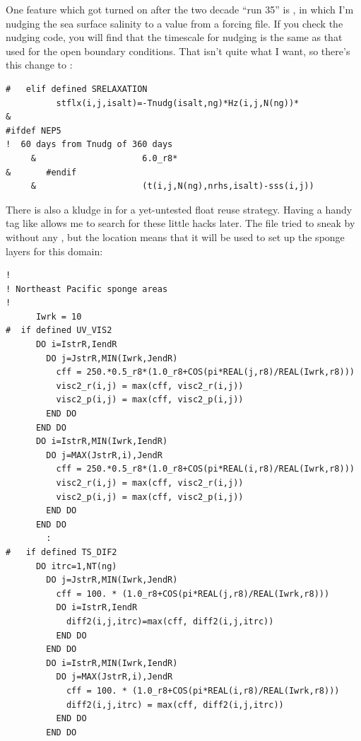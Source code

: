 One feature which got turned on after the two decade ``run 35'' is
, in which I'm nudging the sea surface salinity to
a value from a forcing file. If you check the nudging code, you will
find that the timescale for nudging is the same as that used for the
open boundary conditions. That isn't quite what I want, so there's
this change to :
\begin{verbatim}
#   elif defined SRELAXATION
          stflx(i,j,isalt)=-Tnudg(isalt,ng)*Hz(i,j,N(ng))*
&
#ifdef NEP5   
!  60 days from Tnudg of 360 days
     &                     6.0_r8*
&       #endif
     &                     (t(i,j,N(ng),nrhs,isalt)-sss(i,j))
\end{verbatim}
There is also a kludge in  for a yet-untested
float reuse strategy. Having a handy tag like  allows me
to search for these little hacks later. The file
 tried to sneak by without any
, but the location means that it will be used to set up
the sponge layers for this domain:
\begin{verbatim}
!
! Northeast Pacific sponge areas
!
      Iwrk = 10
#  if defined UV_VIS2
      DO i=IstrR,IendR
        DO j=JstrR,MIN(Iwrk,JendR)
          cff = 250.*0.5_r8*(1.0_r8+COS(pi*REAL(j,r8)/REAL(Iwrk,r8)))
          visc2_r(i,j) = max(cff, visc2_r(i,j))
          visc2_p(i,j) = max(cff, visc2_p(i,j))
        END DO
      END DO
      DO i=IstrR,MIN(Iwrk,IendR)
        DO j=MAX(JstrR,i),JendR
          cff = 250.*0.5_r8*(1.0_r8+COS(pi*REAL(i,r8)/REAL(Iwrk,r8)))
          visc2_r(i,j) = max(cff, visc2_r(i,j))
          visc2_p(i,j) = max(cff, visc2_p(i,j))
        END DO
      END DO
        :
#   if defined TS_DIF2
      DO itrc=1,NT(ng)
        DO j=JstrR,MIN(Iwrk,JendR)
          cff = 100. * (1.0_r8+COS(pi*REAL(j,r8)/REAL(Iwrk,r8)))
          DO i=IstrR,IendR
            diff2(i,j,itrc)=max(cff, diff2(i,j,itrc))
          END DO
        END DO
        DO i=IstrR,MIN(Iwrk,IendR)
          DO j=MAX(JstrR,i),JendR
            cff = 100. * (1.0_r8+COS(pi*REAL(i,r8)/REAL(Iwrk,r8)))
            diff2(i,j,itrc) = max(cff, diff2(i,j,itrc))
          END DO
        END DO
\end{verbatim}

